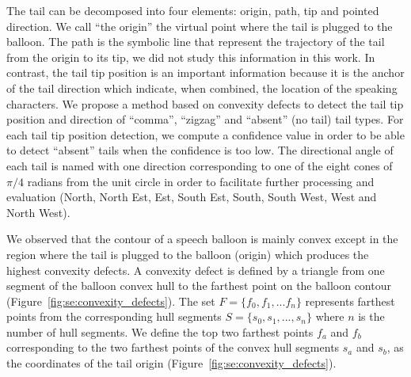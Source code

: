 


The tail can be decomposed into four elements: origin, path, tip and pointed direction.
We call ``the origin'' the virtual point where the tail is plugged to the balloon.
The path is the symbolic line that represent the trajectory of the tail from the origin to its tip, we did not study this information in this work.
In contrast, the tail tip position is an important information because it is the anchor of the tail direction which indicate, when combined, the location of the speaking characters.
We propose a method based on convexity defects to detect the tail tip position and direction of ``comma'', ``zigzag'' and ``absent'' (no tail) tail types.
For each tail tip position detection, we compute a confidence value in order to be able to detect ``absent'' tails when the confidence is too low.
The directional angle of each tail is named with one direction corresponding to one of the eight cones of $\pi/4$ radians from the unit circle in order to facilitate further processing and evaluation (North, North Est, Est, South Est, South, South West, West and North West).

We observed that the contour of a speech balloon is mainly convex except in the region where the tail is plugged to the balloon (origin) which produces the highest convexity defects.
A convexity defect is defined by a triangle from one segment of the balloon convex hull to the farthest point on the balloon contour (Figure~\ref{fig:se:convexity_defects}).
The set $F=\{f_0,f_1,...f_n\}$ represents farthest points from the corresponding hull segments $S=\{s_0, s_1,...,s_n\}$ where $n$ is the number of hull segments.
We define the top two farthest points $f_a$ and $f_b$ corresponding to the two farthest points of the convex hull segments $s_a$ and $s_b$, as the coordinates of the tail origin (Figure~\ref{fig:se:convexity_defects}).

